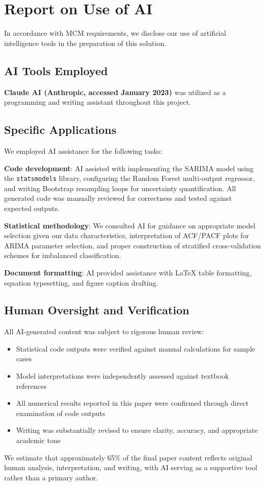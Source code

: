 \documentclass{mcmthesis}
\begin{document}
\section{Report on Use of AI}

In accordance with MCM requirements, we disclose our use of artificial intelligence tools in the preparation of this solution.

\subsection{AI Tools Employed}

\textbf{Claude AI (Anthropic, accessed January 2023)} was utilized as a programming and writing assistant throughout this project.

\subsection{Specific Applications}

We employed AI assistance for the following tasks:

\textbf{Code development}: AI assisted with implementing the SARIMA model using the \texttt{statsmodels} library, configuring the Random Forest multi-output regressor, and writing Bootstrap resampling loops for uncertainty quantification. All generated code was manually reviewed for correctness and tested against expected outputs.

\textbf{Statistical methodology}: We consulted AI for guidance on appropriate model selection given our data characteristics, interpretation of ACF/PACF plots for ARIMA parameter selection, and proper construction of stratified cross-validation schemes for imbalanced classification.

\textbf{Document formatting}: AI provided assistance with LaTeX table formatting, equation typesetting, and figure caption drafting.

\subsection{Human Oversight and Verification}

All AI-generated content was subject to rigorous human review:
\begin{itemize}
\item Statistical code outputs were verified against manual calculations for sample cases
\item Model interpretations were independently assessed against textbook references
\item All numerical results reported in this paper were confirmed through direct examination of code outputs
\item Writing was substantially revised to ensure clarity, accuracy, and appropriate academic tone
\end{itemize}

We estimate that approximately 65\% of the final paper content reflects original human analysis, interpretation, and writing, with AI serving as a supportive tool rather than a primary author.
\end{document}
